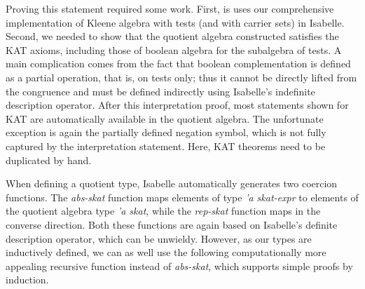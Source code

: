 \documentclass{llncs}
\begin{document}
\noindent Proving this statement required some work. First, is uses
our comprehensive implementation of Kleene algebra with tests (and
with carrier sets) in Isabelle. Second, we needed to show that the
quotient algebra constructed satisfies the KAT axioms, including those
of boolean algebra for the subalgebra of tests. A main complication
comes from the fact that boolean complementation is defined as a
partial operation, that is, on tests only; thus it cannot be directly
lifted from the congruence and must be defined indirectly using
Isabelle's indefinite description operator. After this interpretation
proof, most statements shown for KAT are automatically available in
the quotient algebra. The unfortunate exception is again the partially
defined negation symbol, which is not fully captured by the
interpretation statement. Here, KAT theorems need to be duplicated by
hand.

When defining a quotient type, Isabelle automatically generates two
coercion functions. The \textit{abs-skat} function maps elements of
type \textit{'a skat-expr} to elements of the quotient algebra type
\textit{'a skat}, while the \textit{rep-skat} function maps in the
converse direction. Both these functions are again based on Isabelle's
definite description operator, which can be unwieldy. However, as our
types are inductively defined, we can as well use the following
computationally more appealing recursive function instead of
\textit{abs-skat}, which supports simple proofs by induction.
\end{document}
